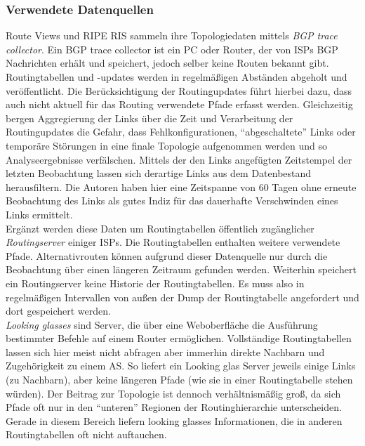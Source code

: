 \subsubsection{Verwendete Datenquellen}
Route Views und RIPE RIS sammeln ihre Topologiedaten mittels \emph{BGP trace collector}.
Ein BGP trace collector ist ein PC oder Router, der von ISPs BGP Nachrichten erhält und speichert, jedoch selber keine Routen bekannt gibt.
Routingtabellen und -updates werden in regelmäßigen Abständen abgeholt und veröffentlicht.
Die Berücksichtigung der Routingupdates führt hierbei dazu, dass auch nicht aktuell für das Routing verwendete Pfade erfasst werden.
Gleichzeitig bergen Aggregierung der Links über die Zeit und Verarbeitung der Routingupdates die Gefahr, dass Fehlkonfigurationen, "`abgeschaltete"' Links oder temporäre Störungen in eine finale Topologie aufgenommen werden und so Analyseergebnisse verfälschen.
Mittels der den Links angefügten Zeitstempel der letzten Beobachtung lassen sich derartige Links aus dem Datenbestand herausfiltern.
Die Autoren haben hier eine Zeitspanne von 60 Tagen ohne erneute Beobachtung des Links als gutes Indiz für das dauerhafte Verschwinden eines Links ermittelt.\\

Ergänzt werden diese Daten um Routingtabellen öffentlich zugänglicher \emph{Routingserver} einiger ISPs.
Die Routingtabellen enthalten weitere verwendete Pfade.
Alternativrouten können aufgrund dieser Datenquelle nur durch die Beobachtung über einen längeren Zeitraum gefunden werden.
Weiterhin speichert ein Routingserver keine Historie der Routingtabellen.
Es muss also in regelmäßigen Intervallen von außen der Dump der Routingtabelle angefordert und dort gespeichert werden.\\

\emph{Looking glasses} sind Server, die über eine Weboberfläche die Ausführung bestimmter Befehle auf einem Router ermöglichen.
Vollständige Routingtabellen lassen sich hier meist nicht abfragen aber immerhin direkte Nachbarn und Zugehörigkeit zu einem AS.
So liefert ein Looking glas Server jeweils einige Links (zu Nachbarn), aber keine längeren Pfade (wie sie in einer Routingtabelle stehen würden).
Der Beitrag zur Topologie ist dennoch verhältnismäßig groß, da sich Pfade oft nur in den "`unteren"' Regionen der Routinghierarchie unterscheiden.
Gerade in diesem Bereich liefern looking glasses Informationen, die in anderen Routingtabellen oft nicht auftauchen.\\

